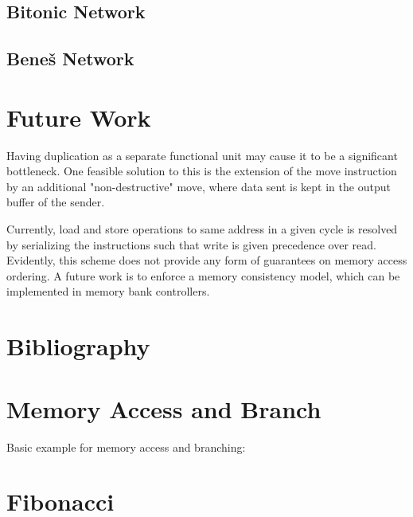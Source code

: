 \documentclass[adraft]{eptcs}
\begin{document}
		\subsection{Bitonic Network}
			
			
		\FloatBarrier
		\subsection{Beneš Network}
			
		
		
	

	\section{Future Work}
	
	
		Having duplication as a separate functional unit may cause it to be a significant bottleneck.
		One feasible solution to this is the extension of the move instruction by an additional "non-destructive" move, where data sent is kept in the output buffer of the sender.
		
		
		Currently, load and store operations to same address in a given cycle is resolved by serializing the instructions such that write is given precedence over read. Evidently, this scheme does not provide any form of guarantees on memory access ordering.
		A future work is to enforce a memory consistency model, which can be implemented in memory bank controllers.
		

	\newpage
	\section{Bibliography}
		
		
	\newpage
	
	\begin{appendices}
		\section{Memory Access and Branch}
			\label{app:simple}
			Basic example for memory access and branching:
			
		
		\newpage
		\section{Fibonacci}
			\label{app:fib}
			
	\end{appendices}
	
\end{document}
